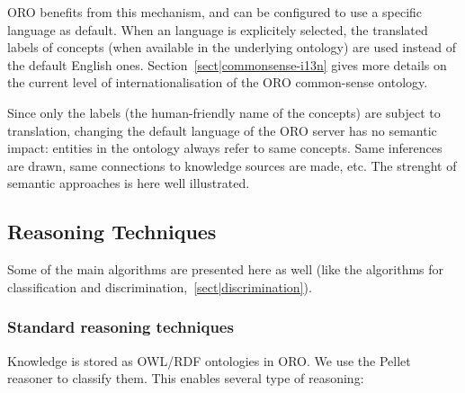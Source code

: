 ORO benefits from this mechanism, and can be configured to use a specific
language as default. When an language is explicitely selected, the translated
labels of concepts (when available in the underlying ontology) are used instead
of the default English ones. Section~\ref{sect|commonsense-i13n} gives more
details on the current level of internationalisation of the ORO common-sense
ontology.

Since only the labels (\ie the human-friendly name of the concepts) are subject
to translation, changing the default language of the ORO server has no semantic
impact: entities in the ontology always refer to same concepts. Same inferences
are drawn, same connections to knowledge sources are made, etc. The strenght of
semantic approaches is here well illustrated.

\subsection{Reasoning Techniques}

Some of the main algorithms are presented here as well (like the algorithms for
classification and discrimination,~\ref{sect|discrimination}).


\subsubsection{Standard reasoning techniques}


Knowledge is stored as OWL/RDF ontologies in ORO. We use the Pellet reasoner to
classify them. This enables several type of reasoning:

